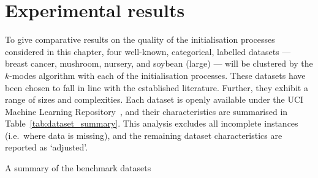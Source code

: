 \begin{table}[htbp]
    \caption{A summary of the relationships between the components of the
             initialisation for \(k\)-modes and those in a matching game
             \((R, H)\).
    }\label{tab:components}
\end{table}



\section{Experimental results}\label{sec:results}

To give comparative results on the quality of the initialisation processes
considered in this chapter, four well-known, categorical, labelled datasets ---
breast cancer, mushroom, nursery, and soybean (large) --- will be clustered by
the \(k\)-modes algorithm with each of the initialisation processes. These
datasets have been chosen to fall in line with the established literature.
Further, they exhibit a range of sizes and complexities. Each dataset is openly
available under the UCI Machine Learning Repository~\cite{Dua2019}, and their
characteristics are summarised in Table~\ref{tab:dataset_summary}. This analysis
excludes all incomplete instances (i.e.\ where data is missing), and the
remaining dataset characteristics are reported as `adjusted'.

\begin{table}
    \resizebox{\textwidth}{!}{}
    \caption{A summary of the benchmark datasets}\label{tab:dataset_summary}
\end{table}

